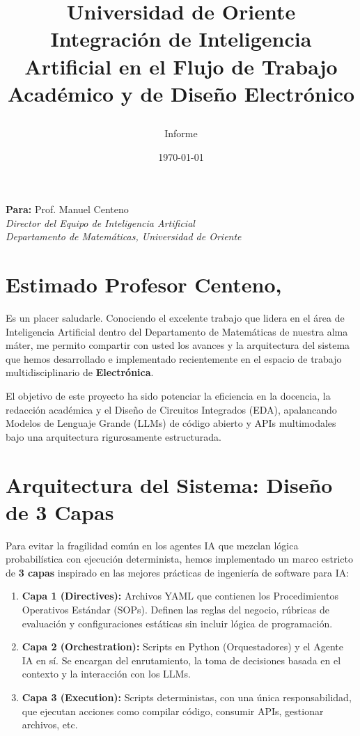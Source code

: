 \documentclass[12pt,letterpaper]{article}
\title{
    \vspace{-2cm}
    \begin{center}
        \Large \textbf{Universidad de Oriente}\\
        \large \textbf{Integración de Inteligencia Artificial en el Flujo de Trabajo Académico y de Diseño Electrónico}
    \end{center}
    \vspace{1cm}
}
\author{Informe}
\date{\today}
\begin{document}
\maketitle

\vspace{-1cm}
\begin{flushright}
\textbf{Para:} Prof. Manuel Centeno\\
\textit{Director del Equipo de Inteligencia Artificial}\\
\textit{Departamento de Matemáticas, Universidad de Oriente}
\end{flushright}
\vspace{0.5cm}

\section*{Estimado Profesor Centeno,}

Es un placer saludarle. Conociendo el excelente trabajo que lidera en el área de Inteligencia Artificial dentro del Departamento de Matemáticas de nuestra alma máter, me permito compartir con usted los avances y la arquitectura del sistema que hemos desarrollado e implementado recientemente en el espacio de trabajo multidisciplinario de \textbf{Electrónica}. 

El objetivo de este proyecto ha sido potenciar la eficiencia en la docencia, la redacción académica y el Diseño de Circuitos Integrados (EDA), apalancando Modelos de Lenguaje Grande (LLMs) de código abierto y APIs multimodales bajo una arquitectura rigurosamente estructurada.

\section{Arquitectura del Sistema: Diseño de 3 Capas}

Para evitar la fragilidad común en los agentes IA que mezclan lógica probabilística con ejecución determinista, hemos implementado un marco estricto de \textbf{3 capas} inspirado en las mejores prácticas de ingeniería de software para IA:

\begin{enumerate}
    \item \textbf{Capa 1 (Directives):} Archivos YAML que contienen los Procedimientos Operativos Estándar (SOPs). Definen las reglas del negocio, rúbricas de evaluación y configuraciones estáticas sin incluir lógica de programación.
    \item \textbf{Capa 2 (Orchestration):} Scripts en Python (Orquestadores) y el Agente IA en sí. Se encargan del enrutamiento, la toma de decisiones basada en el contexto y la interacción con los LLMs.
    \item \textbf{Capa 3 (Execution):} Scripts deterministas, con una única responsabilidad, que ejecutan acciones como compilar código, consumir APIs, gestionar archivos, etc.
\end{enumerate}
\end{document}
